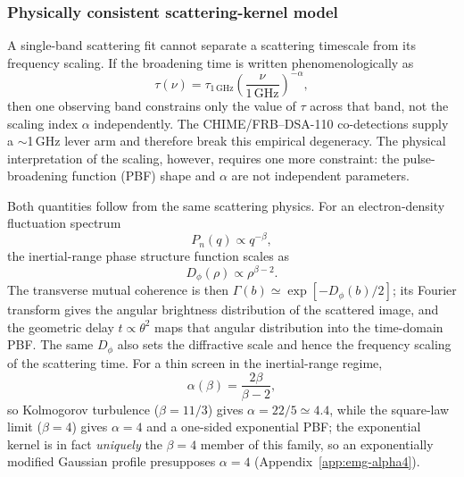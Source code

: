 \subsubsection{Physically consistent scattering-kernel model}
\label{sec:beta-scattering-methods}

A single-band scattering fit cannot separate a scattering timescale from its
frequency scaling. If the broadening time is written phenomenologically as
\begin{equation}
\tau(\nu)=\tau_{1\,\mathrm{GHz}}
\left(\frac{\nu}{1\,\mathrm{GHz}}\right)^{-\alpha},
\end{equation}
then one observing band constrains only the value of $\tau$ across that band,
not the scaling index $\alpha$ independently. The CHIME/FRB--DSA-110
co-detections supply a $\sim$1\,GHz lever arm and therefore break this empirical
degeneracy. The physical interpretation of the scaling, however, requires one
more constraint: the pulse-broadening function (PBF) shape and $\alpha$ are not
independent parameters.

Both quantities follow from the same scattering physics. For an electron-density
fluctuation spectrum
\begin{equation}
P_n(q)\propto q^{-\beta},
\end{equation}
the inertial-range phase structure function scales as
\begin{equation}
D_\phi(\rho)\propto \rho^{\beta-2}.
\end{equation}
The transverse mutual coherence is then
$\Gamma(b)\simeq \exp[-D_\phi(b)/2]$; its Fourier transform gives the angular
brightness distribution of the scattered image, and the geometric delay
$t\propto\theta^2$ maps that angular distribution into the time-domain PBF. The
same $D_\phi$ also sets the diffractive scale and hence the frequency scaling of
the scattering time. For a thin screen in the inertial-range regime,
\begin{equation}
\alpha(\beta)=\frac{2\beta}{\beta-2},
\end{equation}
so Kolmogorov turbulence ($\beta=11/3$) gives
$\alpha=22/5\simeq4.4$, while the square-law limit ($\beta=4$) gives
$\alpha=4$ and a one-sided exponential PBF; the exponential kernel is in fact
\emph{uniquely} the $\beta=4$ member of this family, so an exponentially
modified Gaussian profile presupposes $\alpha=4$
(Appendix~\ref{app:emg-alpha4}).

